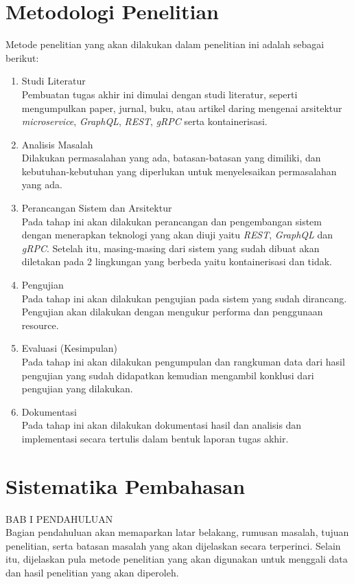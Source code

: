 \section{Metodologi Penelitian}
Metode penelitian yang akan dilakukan dalam penelitian ini adalah sebagai berikut:
\begin{enumerate}[nolistsep,leftmargin=0.5cm]
\item Studi Literatur\\
      Pembuatan tugas akhir ini dimulai dengan studi literatur, seperti mengumpulkan paper, jurnal, buku, atau artikel daring mengenai arsitektur \textit{microservice}, \textit{GraphQL}, \textit{REST}, \textit{gRPC} serta kontainerisasi.
\item Analisis Masalah\\
      Dilakukan permasalahan yang ada, batasan-batasan yang dimiliki, dan kebutuhan-kebutuhan yang diperlukan untuk menyelesaikan permasalahan yang ada.
\item Perancangan Sistem dan Arsitektur\\
      Pada tahap ini akan dilakukan perancangan dan pengembangan sistem dengan menerapkan teknologi yang akan diuji yaitu \textit{REST}, \textit{GraphQL} dan \textit{gRPC}. Setelah itu, masing-masing dari sistem yang sudah dibuat akan diletakan pada 2 lingkungan yang berbeda yaitu kontainerisasi dan tidak.
\item Pengujian\\
      Pada tahap ini akan dilakukan pengujian pada sistem yang sudah dirancang. Pengujian akan dilakukan dengan mengukur performa dan penggunaan resource.
\item Evaluasi (Kesimpulan)\\
      Pada tahap ini akan dilakukan pengumpulan dan rangkuman data dari hasil pengujian yang sudah didapatkan kemudian mengambil konklusi dari pengujian yang dilakukan.
\item Dokumentasi\\
      Pada tahap ini akan dilakukan dokumentasi hasil dan analisis dan implementasi secara tertulis dalam bentuk laporan tugas akhir.
\\
\end{enumerate}

\section{Sistematika Pembahasan}
BAB I   PENDAHULUAN\\
Bagian pendahuluan akan memaparkan latar belakang, rumusan masalah, tujuan penelitian, serta batasan masalah yang akan dijelaskan secara terperinci. Selain itu, dijelaskan pula metode penelitian yang akan digunakan untuk menggali data dan hasil penelitian yang akan diperoleh.\\

